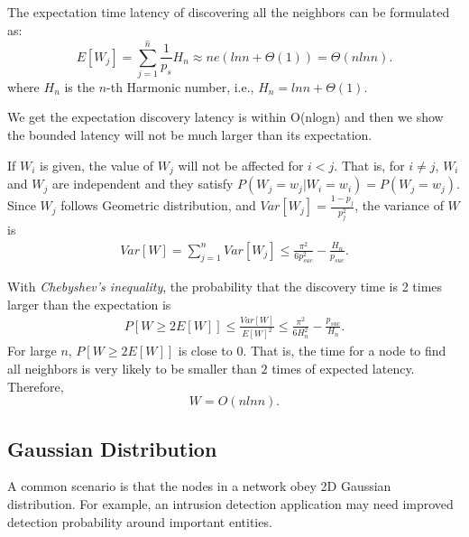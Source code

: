 The expectation time latency of discovering all the neighbors can be formulated as:
$$
E[W_j] = \sum_{j=1}^{\hat{n}}\frac{1}{p_s}H_n \approx ne(lnn + \Theta(1)) = \Theta(nlnn).
$$
where $H_n$ is the $n$-th Harmonic number, i.e.,
$H_n = lnn + \Theta(1)$.

We get the expectation discovery latency is within O(nlogn) and then we
show the bounded latency will not be much larger than its expectation.

If $W_i$ is given, the value of $W_j$ will not be affected for $i<j$. That is, for $i\ne j$, $W_i$ and $W_j$ are independent and they satisfy $P(W_j=w_j|W_i=w_i)=P(W_j=w_j)$. Since $W_j$ follows Geometric distribution, and $Var[W_j]=\frac{1-p_j}{p_j^2}$, the variance of $W$ is
\begin{displaymath}
\begin{split}
 Var[W] %
 =\sum_{j=1}^{n}Var[W_j]
 \le\frac{\pi^2}{6p_{suc}^2}-\frac{H_n}{p_{suc}}.
\end{split}
\end{displaymath}

With \emph{Chebyshev's inequality}, the probability that the discovery time is 2 times larger than the expectation is
\begin{displaymath}
\begin{split}
P[W\ge2E[W]]%
\le\frac{Var[W]}{E[W]^2}
\le\frac{\pi^2}{6H_{n}^2}-\frac{p_{suc}}{H_n}.
\end{split}
\end{displaymath}
For large $n$, $P[W\ge2E[W]]$ is close to 0. That is, the time for a node to find all neighbors is very likely to be smaller than $2$ times of expected latency. Therefore,
\begin{equation*}
W=O(nlnn).
\end{equation*}












\subsection{Gaussian Distribution}
\label{normal}
A common scenario is that the nodes in a network obey 2D Gaussian distribution.
For example, an intrusion detection application may need improved detection 
probability around important entities\cite{wang2013gaussian}.


